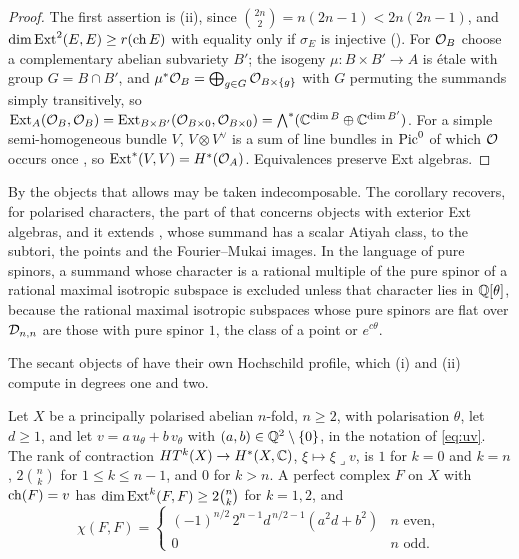 \begin{proof}
The first assertion is (ii), since
$\binom{2n}{2}=n(2n-1)<2n(2n-1)$, and $\dim\operatorname{Ext}^{2}(E,E)\ge r(\operatorname{ch} E)$ with
equality only if $\sigma_{E}$ is injective (). For
$\mathcal{O}_{B}$ choose a complementary abelian subvariety $B'$; the isogeny
$\mu\colon B\times B'\to A$ is \'etale with group $G=B\cap B'$, and
$\mu^{*}\mathcal{O}_{B}=\bigoplus_{g\in G}\mathcal{O}_{B\times\{g\}}$ with $G$ permuting the
summands simply transitively, so $\operatorname{Ext}_{A}(\mathcal{O}_{B},\mathcal{O}_{B})
=\operatorname{Ext}_{B\times B'}(\mathcal{O}_{B\times0},\mathcal{O}_{B\times0})=\bigwedge^{*}(\mathbb{C}^{\dim B}
\oplus\mathbb{C}^{\dim B'})$. For a simple semi-homogeneous bundle $V$,
$V\otimes V^{\vee}$ is a sum of line bundles in $\operatorname{Pic}^{0}$ of which $\mathcal{O}$ occurs
once \cite{Muk78}, so $\operatorname{Ext}^{*}(V,V)=H^{*}(\mathcal{O}_{A})$. Equivalences preserve
Ext algebras.
\end{proof}

By  the objects that 
allows may be taken indecomposable. The corollary recovers, for
polarised characters, the part of  that concerns objects with
exterior Ext algebras, and it extends , whose summand
has a scalar Atiyah class, to the subtori, the points and the Fourier--Mukai
images. In the language of pure spinors, a summand whose
character is a rational multiple of the pure spinor of a rational maximal
isotropic subspace is excluded unless that character lies in $\mathbb{Q}[\theta]$,
because the rational maximal isotropic subspaces whose pure spinors are flat
over $\mathcal{D}_{n,n}$ are those with pure spinor $1$, the class of a point or
$e^{c\theta}$.

The secant objects of  have their own Hochschild
profile, which (i) and (ii) compute in degrees one and two.

\begin{proposition}
\label{prop:secantprofile}
Let $X$ be a principally polarised abelian $n$-fold, $n\ge2$, with
polarisation $\theta$, let $d\ge1$, and let $v=a\,u_{\theta}+b\,v_{\theta}$
with $(a,b)\in\mathbb{Q}^{2}\setminus\{0\}$, in the notation of \eqref{eq:uv}. The
rank of contraction $HT^{k}(X)\to H^{*}(X,\mathbb{C})$, $\xi\mapsto\xi\lrcorner v$, is
$1$ for $k=0$ and $k=n$, $2\binom{n}{k}$ for $1\le k\le n-1$, and $0$ for
$k>n$. A perfect complex $F$ on $X$ with $\operatorname{ch}(F)=v$ has
$\dim\operatorname{Ext}^{k}(F,F)\ge2\binom{n}{k}$ for $k=1,2$, and
\[
  \chi(F,F)=\begin{cases}
    (-1)^{n/2}\,2^{n-1}d^{\,n/2-1}(a^{2}d+b^{2}) & n\text{ even},\\
    0 & n\text{ odd}.
  \end{cases}
\]
\end{proposition}


